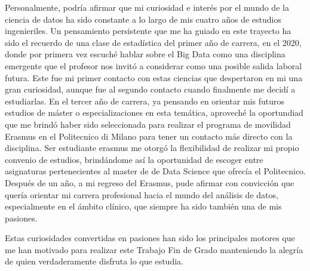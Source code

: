 Personalmente, podría afirmar que mi curiosidad e interés por el mundo de la ciencia de datos ha sido constante a lo largo de mis cuatro años de estudios ingenieriles. Un pensamiento persistente que me ha guiado en este trayecto ha sido el recuerdo de una clase de estadística del primer año de carrera, en el 2020, donde por primera vez escuché hablar sobre el Big Data como una disciplina emergente que el profesor nos invitó a considerar como una posible salida laboral futura. Este fue mi primer contacto con estas ciencias que despertaron en mi una gran curiosidad, aunque fue al segundo contacto cuando finalmente me decidí a estudiarlas.
En el tercer año de carrera, ya pensando en orientar mis futuros estudios de máster o especializaciones en esta temática, aproveché la oportundiad que me brindó haber sido seleccionada para realizar el programa de movilidad Erasmus en el Politecnico di Milano para tener un contacto más directo con la disciplina. Ser estudiante erasmus me otorgó la flexibilidad de realizar mi propio convenio de estudios, brindándome así la oportunidad de escoger entre asignaturas pertenecientes al master de de Data Science que ofrecía el Politecnico. Después de un año, a mi regreso del Erasmus, pude afirmar con convicción que quería orientar mi carrera profesional hacia el mundo del análisis de datos, especialmente en el ámbito clínico, que siempre ha sido también una de mis pasiones.

Estas curiosidades convertidas en pasiones han sido los principales motores que me han motivado para realizar este Trabajo Fin de Grado manteniendo la alegría de quien verdaderamente disfruta lo que estudia. 






    






